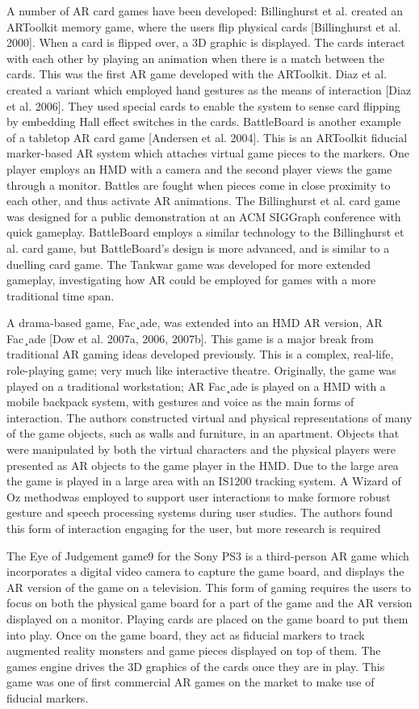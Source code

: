 A number of AR card games have been developed: Billinghurst et al. created an ARToolkit memory game, where the users flip physical cards [Billinghurst et al. 2000]. When a card is flipped over, a 3D graphic is displayed. The cards interact with each other by playing an animation when there is a match between the cards. This was the first AR game developed with the ARToolkit. Diaz et al. created a variant which employed hand gestures as the means of interaction [Diaz et al. 2006]. They used special cards to enable the system to sense card flipping by embedding Hall effect switches in the cards. BattleBoard is another example of a tabletop AR card game [Andersen et al. 2004]. This is an ARToolkit fiducial marker-based AR system which attaches virtual game pieces to the markers. One player employs an HMD with a camera and the second player views the game through a monitor. Battles are fought when pieces come in close proximity to each other, and thus activate AR animations. The Billinghurst et al. card game was designed for a public demonstration at an ACM SIGGraph conference with quick gameplay. BattleBoard employs a similar technology to the Billinghurst et al. card game, but BattleBoard’s design is more advanced, and is similar to a duelling card game. The Tankwar game was developed for more extended gameplay, investigating how AR could be employed for games with a more traditional time span.


A drama-based game, Fac¸ade, was extended into an HMD AR version, AR Fac¸ade [Dow et al. 2007a, 2006, 2007b]. This game is a major break from traditional AR gaming ideas developed previously. This is a complex, real-life, role-playing game; very much like interactive theatre. Originally, the game was played on a traditional workstation; AR Fac¸ade is played on a HMD with a mobile backpack system, with gestures and voice as the main forms of interaction. The authors constructed virtual and physical representations of many of the game objects, such as walls and furniture, in an apartment. Objects that were manipulated by both the virtual characters and the physical players were presented as AR objects to the game player in the HMD. Due to the large area the game is played in a large area with an IS1200 tracking system. A Wizard of Oz methodwas employed to support user interactions to make formore robust gesture and speech processing systems during user studies. The authors found this form of interaction engaging for the user, but more research is required

The Eye of Judgement game9 for the Sony PS3 is a third-person AR game which incorporates a digital video camera to capture the game board, and displays the AR version of the game on a television. This form of gaming requires the users to focus on both the physical game board for a part of the game and the AR version displayed on a monitor. Playing cards are placed on the game board to put them into play. Once on the game board, they act as fiducial markers to track augmented reality monsters and game pieces displayed on top of them. The games engine drives the 3D graphics of the cards once they are in play. This game was one of first commercial AR games on the market to make use of fiducial markers.


